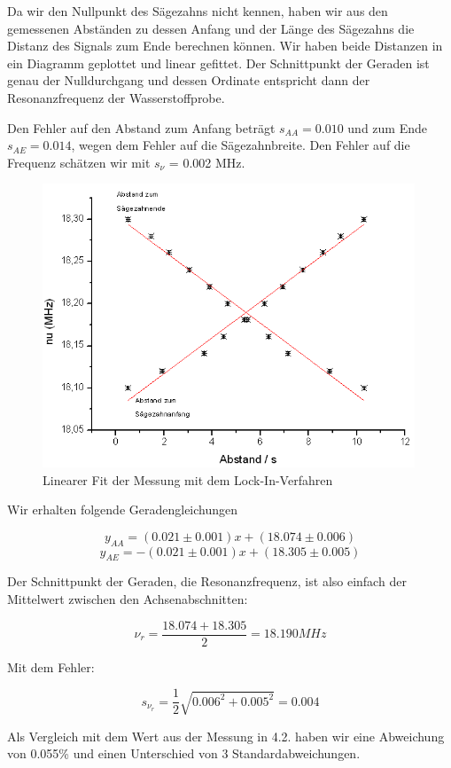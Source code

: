 Da wir den Nullpunkt des Sägezahns nicht kennen, haben wir aus den gemessenen Abständen zu dessen Anfang und der Länge des Sägezahns die Distanz des Signals zum Ende berechnen können. Wir haben beide Distanzen in ein Diagramm geplottet und linear gefittet. Der Schnittpunkt der Geraden ist genau der Nulldurchgang und dessen Ordinate entspricht dann der Resonanzfrequenz der Wasserstoffprobe.

Den Fehler auf den Abstand zum Anfang beträgt $s_{AA}=0.010$ und zum Ende $s_{AE}=0.014$, wegen dem Fehler auf die Sägezahnbreite. Den Fehler auf die Frequenz schätzen wir mit $s_\nu$ = 0.002 MHz.

\begin{figure}[H]
\centering \includegraphics[width=0.99\textwidth]{Bilder/linreg.png}
\caption{Linearer Fit der Messung mit dem Lock-In-Verfahren}
\end{figure}

Wir erhalten folgende Geradengleichungen

$$ y_{AA} = (0.021 \pm 0.001)x + (18.074 \pm 0.006) $$
$$ y_{AE} = -(0.021 \pm 0.001)x + (18.305 \pm 0.005) $$

Der Schnittpunkt der Geraden, die Resonanzfrequenz, ist also einfach der Mittelwert zwischen den Achsenabschnitten:

$$ \boxed{\nu_r = \frac{18.074 + 18.305}{2} = 18.190 MHz} $$

Mit dem Fehler:

$$s_{\nu_r} = \frac{1}{2}\sqrt{0.006^2 + 0.005^2} = 0.004$$

Als Vergleich mit dem Wert aus der Messung in 4.2. haben wir eine Abweichung von 0.055\% und einen Unterschied von 3 Standardabweichungen.

